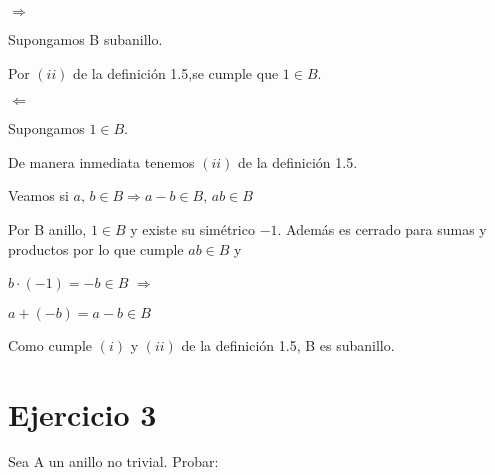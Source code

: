 \documentclass[10pt,a4paper]{article}
\begin{document}
	$\Rightarrow$
	
	Supongamos B subanillo.
	
	Por $(ii)$ de la definición 1.5,se cumple que  $1 \in B$.
	
	\hfill
	
	$\Leftarrow$
	
	Supongamos  $1 \in B$.
	
	De manera inmediata tenemos $(ii)$ de la definición 1.5.
	
	Veamos si $a,\, b \in B \Rightarrow a - b \in B , \, ab \in B$
	
	Por B anillo, $1\in B$ y existe su simétrico $-1$. Además es cerrado para sumas y productos por lo que cumple $ab\in B$ y 
	
	 $b\cdot (-1) = -b \in B$  $\Rightarrow$
	 
	 $a + (-b) = a - b \in B$
	
	\hfill
	
	Como cumple $(i)$ y $(ii)$ de la definición 1.5, B es subanillo.
	
	
	
	
	
	\section{Ejercicio 3}
	
	Sea A un anillo no trivial. Probar:
	
\end{document}
